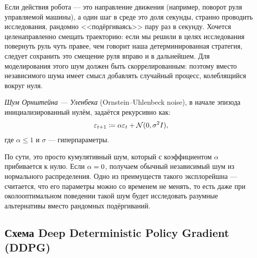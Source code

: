 \begin{example}
Если действия робота --- это направление движения (например, поворот руля управляемой машины), а один шаг в среде это доля секунды, странно проводить исследования, рандомно <<подёргиваясь>> пару раз в секунду. Хочется целенаправленно смещать траекторию: если мы решили в целях исследования повернуть руль чуть правее, чем говорит наша детерминированная стратегия, следует сохранить это смещение руля вправо и в дальнейшем. Для моделирования этого шум должен быть скоррелированным: поэтому вместо независимого шума имеет смысл добавлять случайный процесс, колеблящийся вокруг нуля.
\end{example}

\begin{definition}
\emph{Шум Орнштейна — Уленбека} (Ornstein–Uhlenbeck noise), в начале эпизода инициализированный нулём, задаётся рекурсивно как:
$$\varepsilon_{t + 1} \coloneqq \alpha \varepsilon_t + \mathcal{N}(0, \sigma^2I),$$
где $\alpha \le 1$ и $\sigma$ --- гиперпараметры.
\end{definition}

По сути, это просто кумулятивный шум, который с коэффициентом $\alpha$ прибивается к нулю. Если $\alpha \HM= 0$, получаем обычный независимый шум из нормального распределения. Одно из преимуществ такого эксплорейшна --- считается, что его параметры можно со временем не менять, то есть даже при околооптимальном поведении такой шум будет исследовать разумные альтернативы вместо рандомных подёргиваний.

\subsection{Схема Deep Deterministic Policy Gradient (DDPG)}

